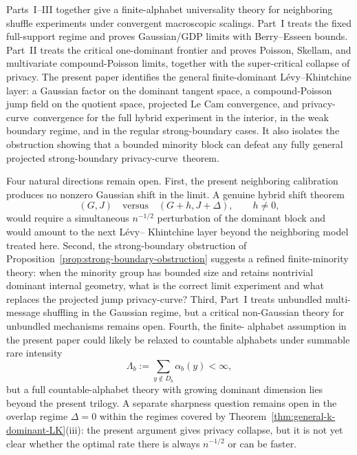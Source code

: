 \documentclass{article}
\newcommand{\1}{\mathbf 1}
\newcommand{\privacycurve}{\mbox{privacy-curve}}
\begin{document}
\begin{tcolorbox}[keybox,title=What the trilogy now covers]
Parts~I--III together give a finite-alphabet universality theory for neighboring shuffle experiments under
convergent macroscopic scalings. Part~I treats the fixed full-support regime and proves Gaussian/GDP limits with
Berry--Esseen bounds. Part~II treats the critical one-dominant frontier and proves Poisson, Skellam, and
multivariate compound-Poisson limits, together with the super-critical collapse of privacy. The present paper
identifies the general finite-dominant L\'evy--Khintchine layer: a Gaussian factor on the dominant tangent space, a
compound-Poisson jump field on the quotient space, projected Le Cam convergence, and \privacycurve\ convergence for
the full hybrid experiment in the interior, in the weak boundary regime, and in the regular strong-boundary cases.
It also isolates the obstruction showing that a bounded minority block can defeat any fully general projected
strong-boundary \privacycurve\ theorem.
\end{tcolorbox}

Four natural directions remain open. First, the present neighboring calibration produces no nonzero Gaussian shift
in the limit. A genuine hybrid shift theorem
\[
(G,J)\quad\text{versus}\quad (G+h,J+\Delta),\qquad h\neq 0,
\]
would require a simultaneous $n^{-1/2}$ perturbation of the dominant block and would amount to the next L\'evy--
Khintchine layer beyond the neighboring model treated here. Second, the strong-boundary obstruction of
Proposition~\ref{prop:strong-boundary-obstruction} suggests a refined finite-minority theory: when the minority
group has bounded size and retains nontrivial dominant internal geometry, what is the correct limit experiment and
what replaces the projected jump \privacycurve? Third, Part~I treats unbundled multi-message shuffling in the
Gaussian regime, but a critical non-Gaussian theory for unbundled mechanisms remains open. Fourth, the finite-
alphabet assumption in the present paper could likely be relaxed to countable alphabets under summable rare
intensity
\[
\Lambda_b:=\sum_{y\notin D_b}\alpha_b(y)<\infty,
\]
but a full countable-alphabet theory with growing dominant dimension lies beyond the present trilogy. A separate
sharpness question remains open in the overlap regime $\Delta=0$ within the regimes covered by
Theorem~\ref{thm:general-k-dominant-LK}\textup{(iii)}: the present argument gives privacy collapse, but it is not
yet clear whether the optimal rate there is always $n^{-1/2}$ or can be faster.
\end{document}
